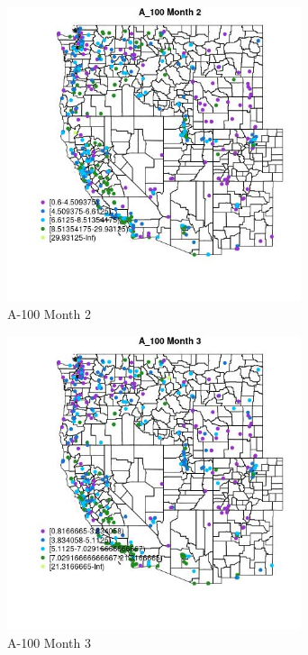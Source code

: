\begin{figure} 
\centering  
\includegraphics[width=0.77\textwidth]{Code_Outputs/ML_input_report_ML_input_PM25_Step5_part_d_de_duplicated_aves_ML_input_MapObsMo2A_100.jpg} 
\caption{\label{fig:ML_input_report_ML_input_PM25_Step5_part_d_de_duplicated_aves_ML_inputMapObsMo2A_100}A-100 Month 2} 
\end{figure} 
 

\begin{figure} 
\centering  
\includegraphics[width=0.77\textwidth]{Code_Outputs/ML_input_report_ML_input_PM25_Step5_part_d_de_duplicated_aves_ML_input_MapObsMo3A_100.jpg} 
\caption{\label{fig:ML_input_report_ML_input_PM25_Step5_part_d_de_duplicated_aves_ML_inputMapObsMo3A_100}A-100 Month 3} 
\end{figure} 
 

